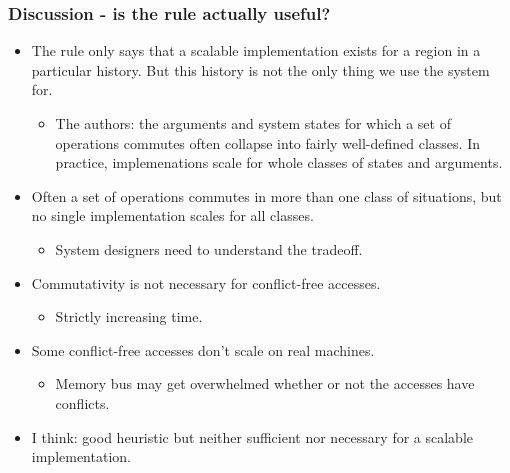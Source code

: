 \documentclass{beamer}
\begin{document}
\begin{frame}
\frametitle{Discussion - is the rule actually useful?}
\begin{itemize}

\item The rule only says that a scalable implementation exists for a region in a
 particular history. But this history is not the only thing we use the system for.

\begin{itemize}
\item The authors: the arguments and system states for which a set of operations
 commutes often collapse into fairly well-defined classes. In practice, implemenations 
scale for whole classes of states and arguments.
\end{itemize}

\item Often a set of operations commutes in more than one class of situations, but no 
single implementation scales for all classes.

\begin{itemize}  
\item System designers need to understand the tradeoff.
\end{itemize}

\item Commutativity is not necessary for conflict-free accesses.
\begin{itemize}
\item Strictly increasing time.
\end{itemize}
\item Some conflict-free accesses don't scale on real machines.

\begin{itemize}
\item Memory bus may get overwhelmed whether or not the accesses have conflicts.
\end{itemize}

\item I think: good heuristic but neither sufficient nor necessary for a scalable 
  implementation.

\end{itemize}

\end{frame}
\end{document}
